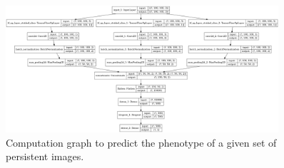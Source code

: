 \documentclass{article}
\begin{document}
\begin{figure}
  \centering \includegraphics[width=0.9\textwidth]{figures/model.png}
  \caption{Computation graph to predict the phenotype of a given set of persistent images.}
  \label{fig:model_arch}
\end{figure}
\end{document}
